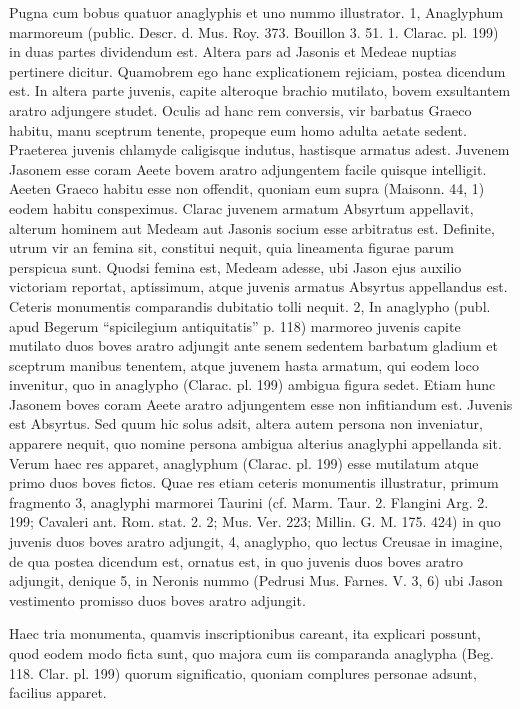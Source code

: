 \documentclass[landscape, a4paper, 11pt, oneside, polutonikogreek, german]{article}
\begin{document}
Pugna cum bobus quatuor anaglyphis et uno nummo illustrator. 1, Anaglyphum marmoreum (public. Descr. d. Mus. Roy. 373. Bouillon 3. 51. 1. Clarac. pl. 199) in duas partes dividendum est. Altera pars ad Jasonis et Medeae nuptias pertinere dicitur. Quamobrem ego hanc explicationem rejiciam, postea dicendum est. In altera parte juvenis, capite alteroque brachio mutilato, bovem exsultantem aratro adjungere studet. Oculis ad hanc rem conversis, vir barbatus Graeco habitu, manu sceptrum tenente, propeque eum homo adulta aetate sedent. Praeterea juvenis chlamyde caligisque indutus, hastisque armatus adest. Juvenem Jasonem esse coram Aeete bovem aratro adjungentem facile quisque intelligit. Aeeten Graeco habitu esse non offendit, quoniam eum supra (Maisonn. 44, 1) eodem habitu conspeximus. Clarac juvenem armatum Absyrtum appellavit, alterum hominem aut Medeam aut Jasonis socium esse arbitratus est. Definite, utrum vir an femina sit, constitui nequit, quia lineamenta figurae parum perspicua sunt. Quodsi femina est, Medeam adesse, ubi Jason ejus auxilio victoriam reportat, aptissimum, atque juvenis armatus Absyrtus appellandus est. Ceteris monumentis comparandis dubitatio tolli nequit. 2, In anaglypho (publ. apud Begerum "`spicilegium antiquitatis"' p. 118) marmoreo juvenis capite mutilato duos boves aratro adjungit ante senem sedentem barbatum gladium et sceptrum manibus tenentem, atque juvenem hasta armatum, qui eodem loco invenitur, quo in anaglypho (Clarac. pl. 199) ambigua figura sedet. Etiam hunc Jasonem boves coram Aeete aratro adjungentem esse non infitiandum est. Juvenis est Absyrtus. Sed quum hic solus adsit, altera autem persona non inveniatur, apparere nequit, quo nomine persona ambigua alterius anaglyphi appellanda sit. Verum haec res apparet, anaglyphum (Clarac. pl. 199) esse mutilatum atque primo duos boves fictos. Quae res etiam ceteris monumentis illustratur, primum fragmento 3, anaglyphi marmorei Taurini (cf. Marm. Taur. 2. Flangini Arg. 2. 199; Cavaleri ant. Rom. stat. 2. 2; Mus. Ver. 223; Millin. G. M. 175. 424) in quo juvenis duos boves aratro adjungit, 4, anaglypho, quo lectus Creusae in imagine, de qua postea dicendum est, ornatus est, in quo juvenis duos boves aratro adjungit, denique 5, in Neronis nummo (Pedrusi Mus. Farnes. V. 3, 6) ubi Jason vestimento promisso duos boves aratro adjungit.

Haec tria monumenta, quamvis inscriptionibus careant, ita explicari possunt, quod eodem modo ficta sunt, quo majora cum iis comparanda anaglypha (Beg. 118. Clar. pl. 199) quorum significatio, quoniam complures personae adsunt, facilius apparet.
\end{document}
